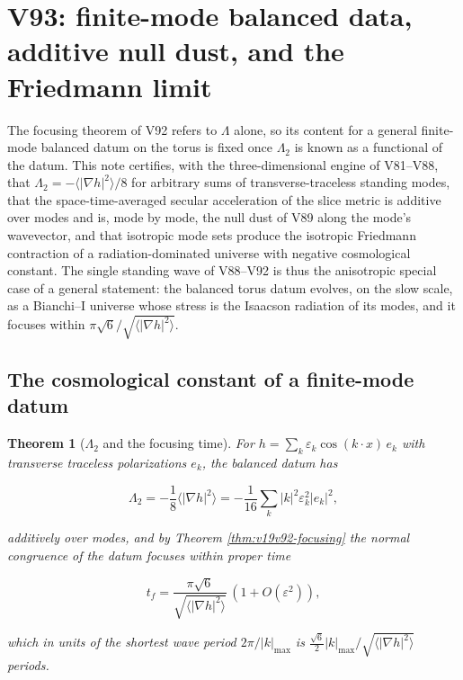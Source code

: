 \documentclass[11pt]{article}
\newtheorem{theorem}{Theorem}[section]
\theoremstyle{remark}
\begin{document}
\section{V93: finite-mode balanced data, additive null dust, and the Friedmann limit}
\label{sec:v19v93}

The focusing theorem of V92 refers to \(\Lambda\) alone, so its
content for a general finite-mode balanced datum on the torus is
fixed once \(\Lambda_2\) is known as a functional of the datum.  This
note certifies, with the three-dimensional engine of V81--V88, that
\(\Lambda_2=-\langle|\nabla h|^2\rangle/8\) for arbitrary sums of
transverse-traceless standing modes, that the space-time-averaged
secular acceleration of the slice metric is additive over modes and
is, mode by mode, the null dust of V89 along the mode's wavevector,
and that isotropic mode sets produce the isotropic Friedmann
contraction of a radiation-dominated universe with negative
cosmological constant.  The single standing wave of V88--V92 is thus
the anisotropic special case of a general statement: the balanced
torus datum evolves, on the slow scale, as a Bianchi--I universe
whose stress is the Isaacson radiation of its modes, and it focuses
within \(\pi\sqrt6/\sqrt{\langle|\nabla h|^2\rangle}\).

\subsection{The cosmological constant of a finite-mode datum}

\begin{theorem}[\(\Lambda_2\) and the focusing time]
\label{thm:v19v93-lambda}
For \(h=\sum_k\varepsilon_k\cos(k\cdot x)\,e_k\) with transverse
traceless polarizations \(e_k\), the balanced datum has

\[
 \Lambda_2=-\frac18\langle|\nabla h|^2\rangle=-\frac1{16}\sum_k|k|^2\varepsilon_k^2|e_k|^2,
                                                                    \tag{96.1}
\]

additively over modes, and by Theorem \ref{thm:v19v92-focusing} the
normal congruence of the datum focuses within proper time

\[
 t_f=\frac{\pi\sqrt6}{\sqrt{\langle|\nabla h|^2\rangle}}\,(1+O(\varepsilon^2)),
                                                                    \tag{96.2}
\]

which in units of the shortest wave period \(2\pi/|k|_{\max}\) is
\(\tfrac{\sqrt6}2|k|_{\max}/\sqrt{\langle|\nabla h|^2\rangle}\) periods.
\end{theorem}
\end{document}
